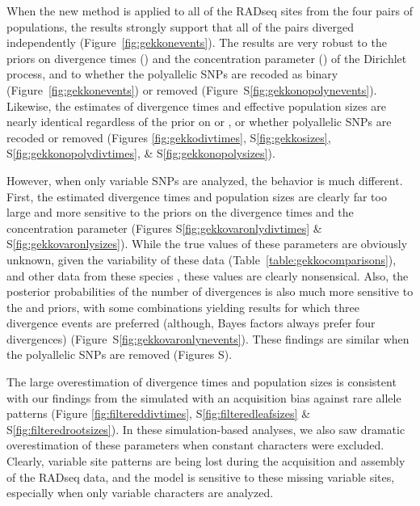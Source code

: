 When the new method is applied to all of the RADseq sites from the
four pairs of  populations, the results strongly
support that all of the pairs diverged independently
(Figure~\ref{fig:gekkonevents}).
The results are very robust to the priors on divergence times (\divtime)
and the concentration parameter (\concentration) of the Dirichlet process, and
to whether the polyallelic SNPs are recoded as binary
(Figure~\ref{fig:gekkonevents})
or removed
(Figure~S\ref{fig:gekkonopolynevents}).
Likewise, the estimates of divergence times and effective population sizes
are nearly identical regardless of the prior on \divtime or \concentration,
or whether polyallelic SNPs are recoded or removed
(Figures
\ref{fig:gekkodivtimes},
S\ref{fig:gekkosizes},
S\ref{fig:gekkonopolydivtimes},
\&
S\ref{fig:gekkonopolysizes}).

However, when only variable SNPs are analyzed, the behavior is much different.
First, the estimated divergence times and population sizes are clearly far too
large and more sensitive to the priors on the divergence times and the
concentration parameter
(Figures
S\ref{fig:gekkovaronlydivtimes}
\&
S\ref{fig:gekkovaronlysizes}).
While the true values of these parameters are obviously unknown, given the
variability of these data (Table~\ref{table:gekkocomparisons}), and other data
from these species \citep{Siler2012, Siler2014kikuchii}, these values are
clearly nonsensical.
Also, the posterior probabilities of the number of divergences is also
much more sensitive to the \divtime and \concentration priors,
with some combinations yielding results for which three divergence events
are preferred (although, Bayes factors always prefer four divergences)
(Figure~S\ref{fig:gekkovaronlynevents}).
These findings are similar when the polyallelic SNPs are removed
(Figures
S).

The large overestimation of divergence times and population sizes is consistent
with our findings from the \datasets simulated with an acquisition bias against
rare allele patterns
(Figure
\ref{fig:filtereddivtimes},
S\ref{fig:filteredleafsizes}
\&
S\ref{fig:filteredrootsizes}).
In these simulation-based analyses, we also saw dramatic overestimation of
these parameters when constant characters were excluded.
Clearly, variable site patterns are being lost during the acquisition and
assembly of the RADseq data, and the model is sensitive to these missing
variable sites, especially when only variable characters are analyzed.


